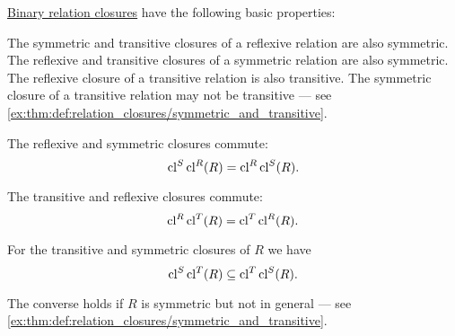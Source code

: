 \begin{proposition}\label{thm:def:relation_closures}
  \hyperref[def:relation_closures]{Binary relation closures} have the following basic properties:
  \begin{thmenum}
     The symmetric and transitive closures of a reflexive relation are also symmetric.
     The reflexive and transitive closures of a symmetric relation are also symmetric.
     The reflexive closure of a transitive relation is also transitive. The symmetric closure of a transitive relation may not be transitive --- see \cref{ex:thm:def:relation_closures/symmetric_and_transitive}.

     The reflexive and symmetric closures commute:
    \begin{equation}\label{eq:thm:def:relation_closures/reflexive_and_symmetric}
      \operatorname{cl}^S \operatorname{cl}^R(R) = \operatorname{cl}^R \operatorname{cl}^S(R).
    \end{equation}

     The transitive and reflexive closures commute:
    \begin{equation}\label{eq:thm:def:relation_closures/reflexive_and_transitive}
      \operatorname{cl}^R \operatorname{cl}^T(R) = \operatorname{cl}^T \operatorname{cl}^R(R).
    \end{equation}

     For the transitive and symmetric closures of \( R \) we have
    \begin{equation}\label{eq:thm:def:relation_closures/symmetric_and_transitive}
      \operatorname{cl}^S \operatorname{cl}^T(R) \subseteq \operatorname{cl}^T \operatorname{cl}^S(R).
    \end{equation}

    The converse holds if \( R \) is symmetric but not in general --- see \cref{ex:thm:def:relation_closures/symmetric_and_transitive}.
  \end{thmenum}
\end{proposition}

